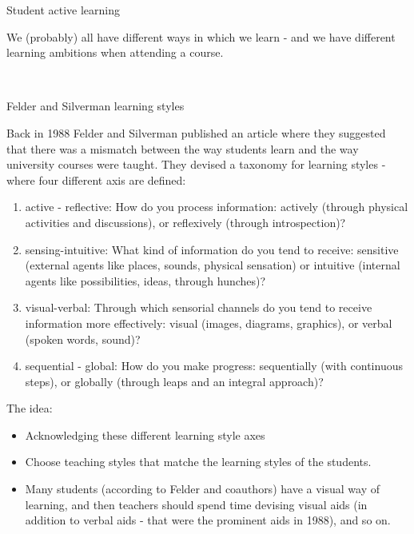 \documentclass[10pt,ignorenonframetext,]{beamer}
\providecommand{\tightlist}{%
  \setlength{\itemsep}{0pt}\setlength{\parskip}{0pt}}
\begin{document}
\begin{frame}{Student active learning}

We (probably) all have different ways in which we learn - and we have
different learning ambitions when attending a course.

~

\begin{block}{Felder and Silverman learning styles}

Back in 1988 Felder and Silverman published an article where they
suggested that there was a mismatch between the way students learn and
the way university courses were taught. They devised a taxonomy for
learning styles - where four different axis are defined:

\end{block}

\end{frame}

\begin{frame}

\begin{enumerate}
\def\labelenumi{\arabic{enumi})}
\tightlist
\item
  active - reflective: How do you process information: actively (through
  physical activities and discussions), or reflexively (through
  introspection)?
\item
  sensing-intuitive: What kind of information do you tend to receive:
  sensitive (external agents like places, sounds, physical sensation) or
  intuitive (internal agents like possibilities, ideas, through
  hunches)?
\item
  visual-verbal: Through which sensorial channels do you tend to receive
  information more effectively: visual (images, diagrams, graphics), or
  verbal (spoken words, sound)?
\item
  sequential - global: How do you make progress: sequentially (with
  continuous steps), or globally (through leaps and an integral
  approach)?
\end{enumerate}

\end{frame}

\begin{frame}

\begin{block}{The idea:}

\begin{itemize}
\item
  Acknowledging these different learning style axes
\item
  Choose teaching styles that matche the learning styles of the
  students.
\item
  Many students (according to Felder and coauthors) have a visual way of
  learning, and then teachers should spend time devising visual aids (in
  addition to verbal aids - that were the prominent aids in 1988), and
  so on.
\end{itemize}

\end{block}

\end{frame}
\end{document}
